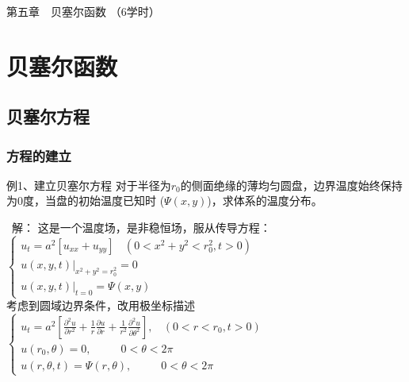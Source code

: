 \begin{frame}
	\frametitle{}
	\begin{center}
	{ {\Huge 第五章~~贝塞尔函数 （6学时）}}
	\end{center}    
\end{frame}

\section{贝塞尔函数}

\subsection{贝塞尔方程}

\begin{frame}
	\frametitle{方程的建立}
	\begin{exampleblock} {例1、建立贝塞尔方程}
		对于半径为$r_0$的侧面绝缘的薄均匀圆盘，边界温度始终保持为0度，当盘的初始温度已知时 ($\Psi(x,y)$)，求体系的温度分布。
    \end{exampleblock}
	\begin{center}
	\end{center}
\end{frame}	

\begin{frame}
	\alert{ 解：}	这是一个温度场，是非稳恒场，服从传导方程：\\
	$\begin{cases}
		u_t=a^2 [u_{xx}   +u_{yy}] ~~~~ (0< x^2 +y^2 <r_0 ^2, t>0)\\
		u(x,y,t)|_{x^2+y^2=r_0 ^2}= 0 \\
		u(x,y,t)|_{t=0}= \Psi(x,y)
	\end{cases} $\\	
	考虑到圆域边界条件，改用极坐标描述\\
	$\begin{cases}
		\displaystyle	u_t=a^2 [ {	\frac{\partial^2 u }{\partial r^2 } +\frac{1}{r } \frac{\partial u }{\partial r } +
		\frac{1}{r^2 } \frac{\partial ^2 u }{\partial \theta ^2
		} }], ~~~~ (0<r<r_0, t>0)\\
		u(r_0,\theta)=0,~~~~~~~~~~~~ 0<\theta <2\pi 	\\
		u(r,\theta,t )=\Psi(r,\theta) ,~~~~~~~~~~~~ 0<\theta <2\pi 	
	\end{cases} $\\
\end{frame}	

